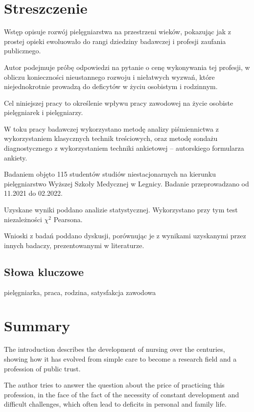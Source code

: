 \documentclass[a4paper,12pt,twoside,openright]{mwrep}
\begin{document}
\chapter*{Streszczenie}


Wstęp opisuje rozwój pielęgniarstwa na przestrzeni wieków, pokazując jak z prostej opieki ewoluowało do rangi dziedziny badawczej i profesji zaufania publicznego. 

Autor podejmuje próbę odpowiedzi na pytanie o cenę wykonywania tej profesji, w obliczu konieczności nieustannego rozwoju i niełatwych wyzwań, które niejednokrotnie prowadzą do deficytów w życiu osobistym i rodzinnym. 

Cel niniejszej pracy to określenie wpływu pracy zawodowej na życie osobiste pielęgniarek i pielęgniarzy.

W toku pracy badawczej wykorzystano metodę analizy piśmiennictwa z wykorzystaniem klasycznych technik treściowych, oraz metodę sondażu diagnostycznego z wykorzystaniem techniki ankietowej – autorskiego formularza ankiety. 

Badaniem objęto 115 studentów studiów niestacjonarnych na kierunku pielęgniarstwo Wyższej Szkoły Medycznej w Legnicy. Badanie przeprowadzano od 11.2021 do 02.2022.

Uzyskane wyniki poddano analizie statystycznej. Wykorzystano przy tym test niezależności $\chi^2$ Pearsona.

Wnioski z badań poddano dyskusji, porównując je z wynikami uzyskanymi przez innych badaczy, prezentowanymi w literaturze.

\vspace{\baselineskip} 

\section*{Słowa kluczowe}

\vspace{\baselineskip} 

pielęgniarka, praca, rodzina, satysfakcja zawodowa

\chapter*{Summary}

The introduction describes the development of nursing over the centuries, showing how it has evolved from simple care to become a research field and a profession of public trust. 

The author tries to answer the question about the price of practicing this profession, in the face of the fact of the necessity of constant development and difficult challenges, which often lead to deficits in personal and family life. 
\end{document}
